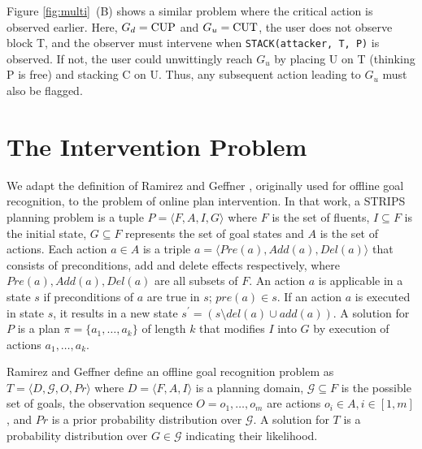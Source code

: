 \documentclass[letterpaper]{article}
\newcommand{\frommak}[1]{\frombody{ForestGreen}{Mak}{#1}}
\newcommand{\frombody}[3]{\noindent\textcolor{#1}{{$\bf [\![\!\![$}\underline{\scshape{#2}} {\scshape says:} \textsl{#3}{$\bf ]\!\!]\!]$}}}
\theoremstyle{plain}
\begin{document}
Figure \ref{fig:multi}~(B) shows a similar problem where the critical action is observed earlier.
Here, $G_d=\textnormal{CUP}$ and $G_u=\textnormal{CUT}$, the user does not observe block T, 
and the observer must intervene when \texttt{STACK(attacker, T, P)} is observed. If not, the user could unwittingly reach $G_u$ by placing U on T (thinking P is free) and stacking C on U. 
Thus, any subsequent action leading  to $G_u$ must also be flagged.






\section{The Intervention Problem}
\label{sec:problemstatement}
We adapt the definition of Ramirez and Geffner , originally used for offline goal recognition, to the problem of online plan intervention.
In that work, a STRIPS \cite{fikes1971strips} planning problem is a tuple $ P = \langle F, A, I, G \rangle$ where $F$ is the set of fluents, $I\subseteq F$ is the initial state, $G  \subseteq F$ represents the set of goal states and $A$ is the set of actions. 
Each action $a \in A$ is a triple $a=\langle Pre(a), Add(a), Del(a)\rangle$ that consists of preconditions, add and delete effects respectively, where $Pre(a), Add(a), Del(a)$ are all subsets of $F$. 
An action $a$ is applicable in a state $s$ if preconditions of $a$ are true in $s$; $pre(a) \in s$. 
If an action $a$ is executed in state $s$, it results in a new state $s^{\prime} = (s \setminus del(a) \cup add(a))$.  
A solution for $P$ is a plan $\pi = \{a_1, \dots ,a_k\}$ of length $k$ that modifies $I$ into $G$ by execution of actions $a_1, \dots ,a_k$.

Ramirez and Geffner  define an offline goal recognition problem as $T= \langle D, \mathcal{G}, O, Pr \rangle$ where $D=\langle F, A, I \rangle$ is a planning domain, $\mathcal{G} \subseteq F$ is the possible set of goals, the observation sequence $O = o_1, \ldots , o_m$ are actions $o_i \in A, i \in[1,m]$, and $Pr$ is a prior probability distribution over $\mathcal{G}$. A solution for $T$ is a probability distribution over $G \in \mathcal{G}$ indicating their likelihood.
\end{document}
